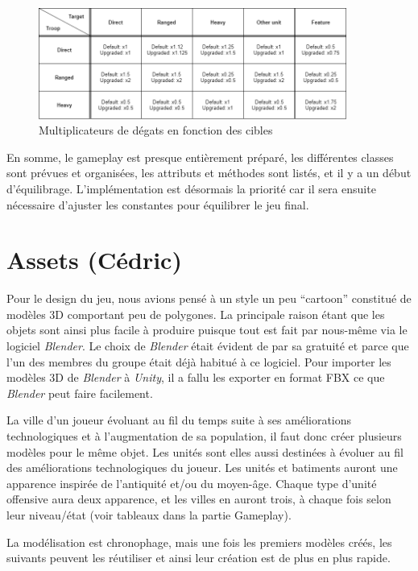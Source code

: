 \documentclass[12pt]{report}
\begin{document}
\begin{figure}[H]
    \centering
    \includegraphics[width=0.9\textwidth]{DIAG_TROOPS__damage_multipliers}
    \caption{Multiplicateurs de dégats en fonction des cibles}
\end{figure}

En somme, le gameplay est presque entièrement préparé, les différentes classes sont prévues et organisées, les attributs et méthodes sont listés, et il y a un début d’équilibrage. L'implémentation est désormais la priorité car il sera ensuite nécessaire d'ajuster les constantes pour équilibrer le jeu final.

\section{Assets (Cédric)}

Pour le design du jeu, nous avions pensé à un style un peu “cartoon” constitué de modèles 3D comportant peu de polygones. La principale raison étant que les objets sont ainsi plus facile à produire puisque tout est fait par nous-même via le logiciel \textit{Blender}. Le choix de \textit{Blender} était évident de par sa gratuité et parce que l’un des membres du groupe était déjà habitué à ce logiciel. Pour importer les modèles 3D de \textit{Blender} à \textit{Unity}, il a fallu les exporter en format FBX ce que \textit{Blender} peut faire facilement.

La ville d’un joueur évoluant au fil du temps suite à ses améliorations technologiques et à l’augmentation de sa population, il faut donc créer plusieurs modèles pour le même objet. Les unités sont elles aussi destinées à évoluer au fil des améliorations technologiques du joueur. Les unités et batiments auront une apparence inspirée de l'antiquité et/ou du moyen-âge. Chaque type d'unité offensive aura deux apparence, et les villes en auront trois, à chaque fois selon leur niveau/état (voir tableaux dans la partie Gameplay).

\newpage

La modélisation est chronophage, mais une fois les premiers modèles créés, les suivants peuvent les réutiliser et ainsi leur création est de plus en plus rapide.
\end{document}
